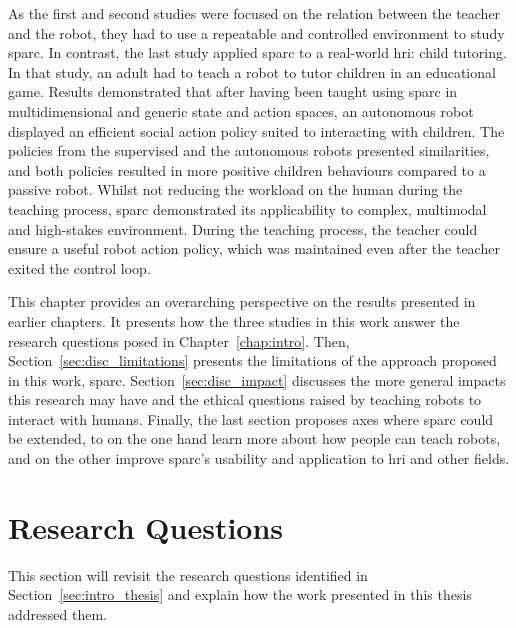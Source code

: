 As the first and second studies were focused on the relation between the teacher and the robot, they had to use a repeatable and controlled environment to study \gls{sparc}. In contrast, the last study applied \gls{sparc} to a real-world \gls{hri}: child tutoring. In that study, an adult had to teach a robot to tutor children in an educational game. Results demonstrated that after having been taught using \gls{sparc} in multidimensional and generic state and action spaces, an autonomous robot displayed an efficient social action policy suited to interacting with children. The policies from the supervised and the autonomous robots presented similarities, and both policies resulted in more positive children behaviours compared to a passive robot. Whilst not reducing the workload on the human during the teaching process, \gls{sparc} demonstrated its applicability to complex, multimodal and high-stakes environment. During the teaching process, the teacher could ensure a useful robot action policy, which was maintained even after the teacher exited the control loop.

This chapter provides an overarching perspective on the results presented in earlier chapters. It presents how the three studies in this work answer the research questions posed in Chapter~\ref{chap:intro}. Then, Section~\ref{sec:disc_limitations} presents the limitations of the approach proposed in this work, \gls{sparc}. Section~\ref{sec:disc_impact} discusses the more general impacts this research may have and the ethical questions raised by teaching robots to interact with humans.
Finally, the last section proposes axes where \gls{sparc} could be extended, to on the one hand learn more about how people can teach robots, and on the other improve \gls{sparc}'s usability and application to \gls{hri} and other fields.

\section{Research Questions} \label{sec:disc_rq}

This section will revisit the research questions identified in Section~\ref{sec:intro_thesis} and explain how the work presented in this thesis addressed them.

